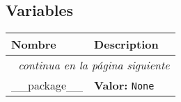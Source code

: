   \subsection{Variables}

    \vspace{-1cm}
\hspace{\varindent}\begin{longtable}{|p{\varnamewidth}|p{\vardescrwidth}|l}
\cline{1-2}
\cline{1-2} \centering \textbf{Nombre} & \centering \textbf{Description}& \\
\cline{1-2}
\endhead\cline{1-2}\multicolumn{3}{r}{\small\textit{continua en la página siguiente}}\\\endfoot\cline{1-2}
\endlastfoot\raggedright \_\-\_\-p\-a\-c\-k\-a\-g\-e\-\_\-\_\- & \raggedright \textbf{Valor:} 
{\tt None}&\\
\cline{1-2}
\end{longtable}

